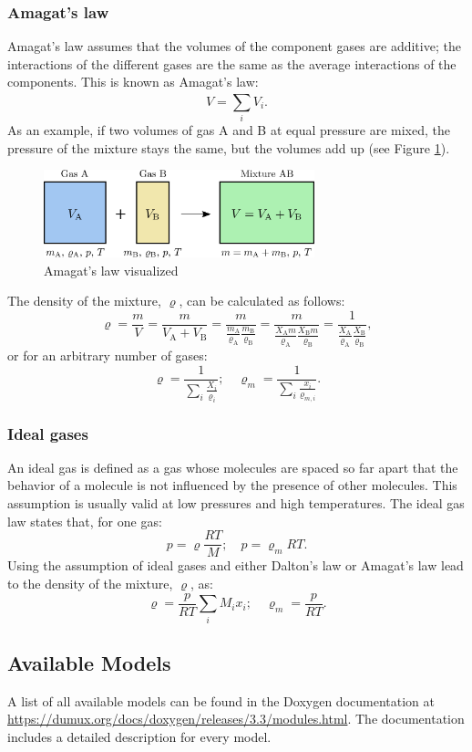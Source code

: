 \subsubsection{Amagat's law}
Amagat's law assumes that the volumes of the component gases are additive; the interactions of the different gases are the same as the average interactions of the components. This is known as Amagat's law:
%
\begin{equation}
V = \sum_{i}^{}V_i.
\end{equation}
%
As an example, if two volumes of gas A and B at equal pressure are mixed, the pressure of the mixture stays the same, but the volumes add up (see Figure \ref{fig:dalton2}).
%
\begin{figure}[ht]
  \centering
  \includegraphics[width=0.7\textwidth]{png/dalton2.png}
  \caption{Amagat's law visualized}
  \label{fig:dalton2}
\end{figure}
%
The density of the mixture, $\varrho$, can be calculated as follows:
\begin{equation}
\varrho = \frac{m}{V} = \frac{m}{V_\mathrm{A} + V_\mathrm{B}} = \frac{m}{\frac{m_\mathrm{A}}{\varrho_\mathrm{A}} \frac{m_\mathrm{B}}{\varrho_\mathrm{B}}} =
\frac{m}{\frac{X_\mathrm{A} m}{\varrho_\mathrm{A}} \frac{X_\mathrm{B} m}{\varrho_\mathrm{B}}} = \frac{1}{\frac{X_\mathrm{A}}{\varrho_\mathrm{A}} \frac{X_\mathrm{B}}{\varrho_\mathrm{B}}},
\end{equation}
%
or for an arbitrary number of gases:
%
\begin{equation}
\varrho = \frac{1}{\sum_{i}^{}\frac{X_i}{\varrho_i}}  ; \quad  \varrho_m = \frac{1}{\sum_{i}^{}\frac{x_i}{\varrho_{m,i}}}.
\end{equation}
%
\subsubsection{Ideal gases}
An ideal gas is defined as a gas whose molecules are spaced so far apart that the behavior of a molecule is not influenced by the presence of other molecules.
This assumption is usually valid at low pressures and high temperatures. The ideal gas law states that, for one gas:
%
\begin{equation}
p = \varrho \frac{RT}{M} ; \quad p= \varrho_m RT.
\end{equation}
%
Using the assumption of ideal gases and either Dalton's law or Amagat's law lead to the density of the mixture, $\varrho$, as:
%
\begin{equation}
\varrho = \frac{p}{RT} \sum_{i}^{}M_i x_i ; \quad \varrho_m = \frac{p}{RT}.
\end{equation}
%
\subsection{Available Models}
A list of all available models can be found
in the Doxygen documentation at
\url{https://dumux.org/docs/doxygen/releases/3.3/modules.html}.
The documentation includes a detailed description for every model.
